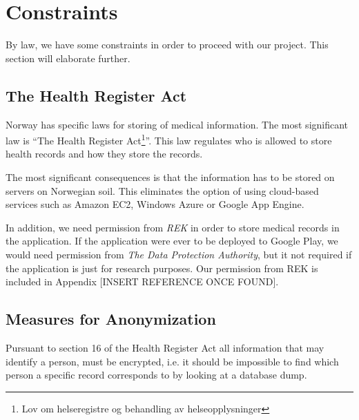 \section{Constraints}
\label{sec:securityrequirements}

By law, we have some constraints in order to proceed with our project. This section will elaborate further. 

\subsection{The Health Register Act}
\label{sec:helseregisterloven}

Norway has specific laws for storing of medical information. The most significant law is ``The Health Register Act\footnote{Lov om helseregistre og behandling av helseopplysninger}''\cite{helseregisterloven}. This law regulates who is allowed to store health records and how they store the records. 

The most significant consequences is that the information has to be stored on servers on Norwegian soil. This eliminates the option of using cloud-based services such as Amazon EC2, Windows Azure or Google App Engine. 

In addition, we need permission from \emph{REK}  in order to store medical records in the application. If the application were ever to be deployed to Google Play, we would need permission from \emph{The Data Protection Authority}, but it not required if the application is just for research purposes. Our permission from REK is included in Appendix [INSERT REFERENCE ONCE FOUND].

\subsection{Measures for Anonymization}
Pursuant to section 16 of the Health Register Act \cite{helseregisterloven} all information that may identify a person, must be encrypted, i.e. it should be impossible to find which person a specific record corresponds to by looking at a database dump.  


